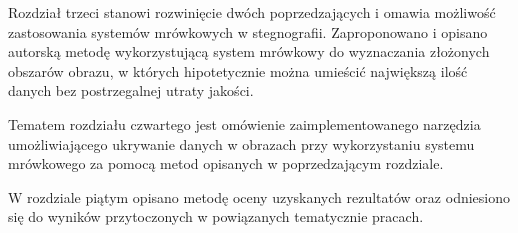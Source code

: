 {    Rozdział trzeci stanowi rozwinięcie dwóch poprzedzających i omawia możliwość zastosowania systemów mrówkowych w
    stegnografii. Zaproponowano i opisano autorską metodę wykorzystującą system mrówkowy do wyznaczania złożonych
    obszarów obrazu, w których hipotetycznie można umieścić największą ilość danych bez postrzegalnej utraty jakości.

    Tematem rozdziału czwartego jest omówienie zaimplementowanego narzędzia umożliwiającego ukrywanie danych w obrazach
    przy wykorzystaniu systemu mrówkowego za pomocą metod opisanych w poprzedzającym rozdziale.

    W rozdziale piątym opisano metodę oceny uzyskanych rezultatów oraz odniesiono się do wyników przytoczonych w
    powiązanych tematycznie pracach.
}
